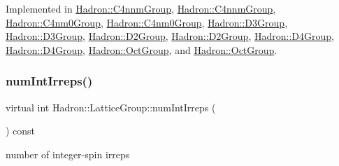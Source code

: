 Implemented in \mbox{\hyperlink{structHadron_1_1C4nnmGroup_afc1f011462142b5aa3ddab6e5824d365}{Hadron\+::\+C4nnm\+Group}}, \mbox{\hyperlink{structHadron_1_1C4nnmGroup_afc1f011462142b5aa3ddab6e5824d365}{Hadron\+::\+C4nnm\+Group}}, \mbox{\hyperlink{structHadron_1_1C4nm0Group_aefbae18f6b66563a061d607e680fcab7}{Hadron\+::\+C4nm0\+Group}}, \mbox{\hyperlink{structHadron_1_1C4nm0Group_aefbae18f6b66563a061d607e680fcab7}{Hadron\+::\+C4nm0\+Group}}, \mbox{\hyperlink{structHadron_1_1D3Group_a442d9bebc6eae854024be8123fda60d8}{Hadron\+::\+D3\+Group}}, \mbox{\hyperlink{structHadron_1_1D3Group_a442d9bebc6eae854024be8123fda60d8}{Hadron\+::\+D3\+Group}}, \mbox{\hyperlink{structHadron_1_1D2Group_a15d5aa6a889d3e0f27c3f2796d7157ae}{Hadron\+::\+D2\+Group}}, \mbox{\hyperlink{structHadron_1_1D2Group_a15d5aa6a889d3e0f27c3f2796d7157ae}{Hadron\+::\+D2\+Group}}, \mbox{\hyperlink{structHadron_1_1D4Group_a814de4e3ea523397868aee44d639c5cf}{Hadron\+::\+D4\+Group}}, \mbox{\hyperlink{structHadron_1_1D4Group_a814de4e3ea523397868aee44d639c5cf}{Hadron\+::\+D4\+Group}}, \mbox{\hyperlink{structHadron_1_1OctGroup_abc0b88d4a62fb81c996b6638827cc187}{Hadron\+::\+Oct\+Group}}, and \mbox{\hyperlink{structHadron_1_1OctGroup_abc0b88d4a62fb81c996b6638827cc187}{Hadron\+::\+Oct\+Group}}.

\mbox{\label{structHadron_1_1LatticeGroup_af2aa7b39222bf188389356eefcef7547}} 
\subsubsection{\texorpdfstring{numIntIrreps()}{numIntIrreps()}\hspace{0.1cm}{\footnotesize\ttfamily [2/2]}}
{\footnotesize\ttfamily virtual int Hadron\+::\+Lattice\+Group\+::num\+Int\+Irreps (\begin{DoxyParamCaption}{ }\end{DoxyParamCaption}) const\hspace{0.3cm}{\ttfamily [pure virtual]}}

number of integer-\/spin irreps 

